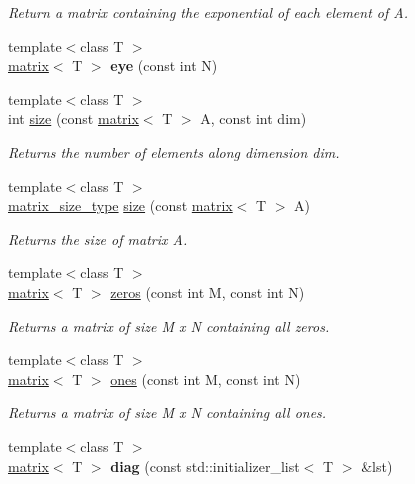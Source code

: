 \begin{DoxyCompactItemize}
\begin{DoxyCompactList}\small\item\em Return a matrix containing the exponential of each element of A. \end{DoxyCompactList}\item 
\hypertarget{namespacekeycpp_a90a6f9aaec03f1f72bf4013316795c5f}{{\footnotesize template$<$class T $>$ }\\\hyperlink{classkeycpp_1_1matrix}{matrix}$<$ T $>$ {\bfseries eye} (const int N)}\label{namespacekeycpp_a90a6f9aaec03f1f72bf4013316795c5f}

\item 
{\footnotesize template$<$class T $>$ }\\int \hyperlink{namespacekeycpp_a2dc5102775ed955f378432f84fe96987}{size} (const \hyperlink{classkeycpp_1_1matrix}{matrix}$<$ T $>$ A, const int dim)
\begin{DoxyCompactList}\small\item\em Returns the number of elements along dimension dim. \end{DoxyCompactList}\item 
{\footnotesize template$<$class T $>$ }\\\hyperlink{structkeycpp_1_1matrix__size__type}{matrix\-\_\-size\-\_\-type} \hyperlink{namespacekeycpp_a028e501a865c86bdf616ea13e87645fa}{size} (const \hyperlink{classkeycpp_1_1matrix}{matrix}$<$ T $>$ A)
\begin{DoxyCompactList}\small\item\em Returns the size of matrix A. \end{DoxyCompactList}\item 
{\footnotesize template$<$class T $>$ }\\\hyperlink{classkeycpp_1_1matrix}{matrix}$<$ T $>$ \hyperlink{namespacekeycpp_a86f1406f9fad5a439d8eff01aba8eac6}{zeros} (const int M, const int N)
\begin{DoxyCompactList}\small\item\em Returns a matrix of size M x N containing all zeros. \end{DoxyCompactList}\item 
{\footnotesize template$<$class T $>$ }\\\hyperlink{classkeycpp_1_1matrix}{matrix}$<$ T $>$ \hyperlink{namespacekeycpp_ace6f21832ab61f8f15e5b35e0a5cdb3e}{ones} (const int M, const int N)
\begin{DoxyCompactList}\small\item\em Returns a matrix of size M x N containing all ones. \end{DoxyCompactList}\item 
\hypertarget{namespacekeycpp_a88b11f2372831ebb28fcd2a9961c4eab}{{\footnotesize template$<$class T $>$ }\\\hyperlink{classkeycpp_1_1matrix}{matrix}$<$ T $>$ {\bfseries diag} (const std\-::initializer\-\_\-list$<$ T $>$ \&lst)}\label{namespacekeycpp_a88b11f2372831ebb28fcd2a9961c4eab}


\end{DoxyCompactItemize}
